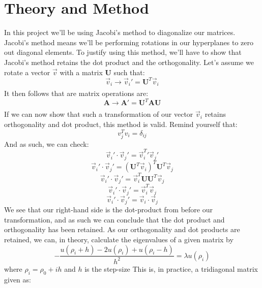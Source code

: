 \documentclass{article}
\begin{document}
\section{Theory and Method}
In this project we'll be using Jacobi's method to diagonalize our matrices. Jacobi's method means we'll be performing rotations in our hyperplanes to zero out diagonal elements. \newline
To justify using this method, we'll have to show that Jacobi's method retains the dot product and the orthogonality. \newline
Let's assume we rotate a vector $\Vec{v}$ with a matrix \textbf{U} such that:
\begin{equation*}
    \Vec{v}_i \xrightarrow[]{} \Vec{v}_i' = \textbf{U}^T \Vec{v}_i
\end{equation*} \newpage
It then follows that are matrix operations are:
\begin{equation*}
    \textbf{A} \xrightarrow[]{} \textbf{A}' = \textbf{U}^T \textbf{A} \textbf{U}
\end{equation*}
If we can now show that such a transformation of our vector $\Vec{v}_i$ retains orthogonality and dot product, this method is valid. Remind yourself that:
\begin{equation*}
    v_{j}^{T}v_i = \delta_{ij}
\end{equation*}
And as such, we can check:
$$\Vec{v}_i'\cdot \Vec{v}_j' = \Vec{v}_i^{T}' \Vec{v}_j'$$
$$\Vec{v}_i'\cdot \Vec{v}_j' = (\textbf{U}^T \Vec{v}_i)^T \textbf{U}^T \Vec{v}_j $$
$$\Vec{v}_i'\cdot \Vec{v}_j' = \Vec{v}_i^T \textbf{U}\textbf{U}^T \Vec{v}_j$$
$$\Vec{v}_i'\cdot \Vec{v}_j' = \Vec{v}_i^T \Vec{v}_j$$
$$\Vec{v}_i'\cdot \Vec{v}_j' = \Vec{v}_i \cdot \Vec{v}_j$$
We see that our right-hand side is the dot-product from before our transformation, and as such we can conclude that the dot product and orthogonality has been retained.
\newline
As our orthogonality and dot products are retained, we can, in theory, calculate the eigenvalues of a given matrix by
\begin{equation} \label{1}
    -\frac{u(\rho_i+h) -2u(\rho_i) +u(\rho_i-h)}{h^2}  = \lambda u(\rho_i)
\end{equation}
\newline
where $\rho_i = \rho_0 + ih$ and $h$ is the step-size \newline
This is, in practice, a tridiagonal matrix given as:
\end{document}
